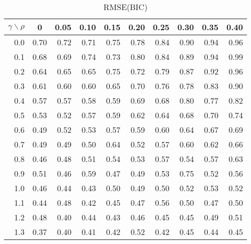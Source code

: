 \documentclass[12pt]{article}
\begin{document}
%
\begin{table}[!tbp]
\caption{RMSE(BIC)}
 \begin{center}
 \begin{tabular}{r|rrrrrrrrr}\hline\hline
\multicolumn{1}{c|}{$\gamma\backslash\rho$}&\multicolumn{1}{c}{0}&\multicolumn{1}{c}{0.05}&\multicolumn{1}{c}{0.10}&\multicolumn{1}{c}{0.15}&\multicolumn{1}{c}{0.20}&\multicolumn{1}{c}{0.25}&\multicolumn{1}{c}{0.30}&\multicolumn{1}{c}{0.35}&\multicolumn{1}{c}{0.40}\tabularnewline
\hline

0.0&0.70&0.72&0.71&0.75&0.78&0.84&0.90&0.94&0.96\tabularnewline
0.1&0.68&0.69&0.74&0.73&0.80&0.84&0.89&0.94&0.99\tabularnewline
0.2&0.64&0.65&0.65&0.75&0.72&0.79&0.87&0.92&0.96\tabularnewline
0.3&0.61&0.60&0.60&0.65&0.70&0.76&0.78&0.83&0.90\tabularnewline
0.4&0.57&0.57&0.58&0.59&0.69&0.68&0.80&0.77&0.82\tabularnewline
0.5&0.53&0.52&0.57&0.59&0.62&0.64&0.68&0.70&0.74\tabularnewline
0.6&0.49&0.52&0.53&0.57&0.59&0.60&0.64&0.67&0.69\tabularnewline
0.7&0.49&0.49&0.50&0.64&0.52&0.57&0.60&0.62&0.66\tabularnewline
0.8&0.46&0.48&0.51&0.54&0.53&0.57&0.54&0.57&0.63\tabularnewline
0.9&0.51&0.46&0.59&0.47&0.49&0.53&0.75&0.52&0.56\tabularnewline
1.0&0.46&0.44&0.43&0.50&0.49&0.50&0.52&0.53&0.52\tabularnewline
1.1&0.44&0.48&0.42&0.45&0.47&0.56&0.50&0.47&0.50\tabularnewline
1.2&0.48&0.40&0.44&0.43&0.46&0.45&0.45&0.49&0.51\tabularnewline
1.3&0.37&0.40&0.41&0.42&0.52&0.42&0.45&0.44&0.45\tabularnewline
\hline
\end{tabular}

\end{center}

\end{table}
\end{document}
